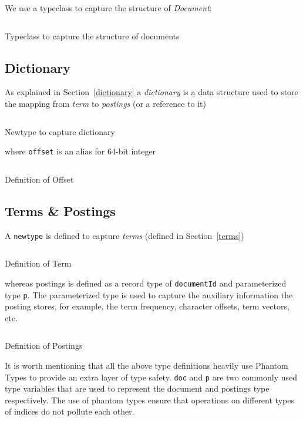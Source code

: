 We use a typeclass to capture the structure of \textit{Document}:
\begin{listing}
\inputminted{haskell}{hs/document.hs}
\caption{Typeclass to capture the structure of documents}
\end{listing}

\subsection{Dictionary}
As explained in Section~\ref{dictionary} a \textit{dictionary} is a data structure used to store the mapping from \textit{term} to \textit{postings} (or a reference to it)
\begin{listing}
\inputminted{haskell}{hs/dictionary.hs}
\caption{Newtype to capture dictionary}
\end{listing}

\pagebreak
\noindent where \texttt{offset} is an alias for 64-bit integer
\begin{listing}
\inputminted{haskell}{hs/offset.hs}
\caption{Definition of Offset}
\end{listing}

\subsection{Terms \& Postings}
A \texttt{newtype} is defined to capture \textit{terms} (defined in Section~\ref{terms})
\begin{listing}
\inputminted{haskell}{hs/term.hs}
\caption{Definition of Term}
\end{listing}

\noindent whereas postings is defined as a record type of \texttt{documentId} and parameterized type \texttt{p}.
The parameterized type is used to capture the auxiliary information the posting stores, for example,
the term frequency, character offsets, term vectors, etc.
\begin{listing}
\inputminted{haskell}{hs/postings.hs}
\caption{Definition of Postings}
\end{listing}

It is worth mentioning that all the above type definitions heavily use Phantom Types\cite{cheney2003phantom} to provide an extra layer of type safety.
\texttt{doc} and \texttt{p} are two commonly used type variables that are used to represent the document and postings type respectively.
The use of phantom types ensure that operations on different types of indices do not pollute each other.


